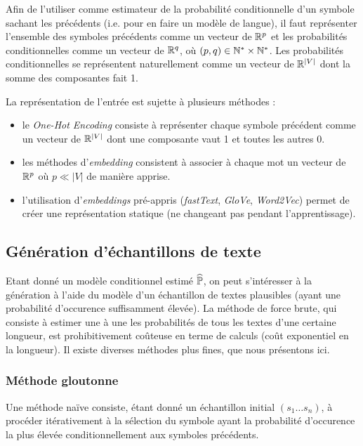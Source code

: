 Afin de l'utiliser comme estimateur de la probabilité conditionnelle d'un symbole sachant les précédents (i.e. pour en faire un modèle de langue), il faut représenter l'ensemble des symboles précédents comme un vecteur de $\R^p$ et les probabilités conditionnelles comme un vecteur de $\R^q$, où $(p,q) \in \N^*\times \N^*$.
Les probabilités conditionnelles se représentent naturellement comme un vecteur de $\R^{\vert V \vert}$ dont la somme des composantes fait 1.

La représentation de l'entrée est sujette à plusieurs méthodes :
\begin{itemize}
  \item le \textit{One-Hot Encoding} consiste à représenter chaque symbole précédent comme un vecteur de $\R^{\vert V \vert}$ dont une composante vaut 1 et toutes les autres 0.
  \item les méthodes d'\textit{embedding} consistent à associer à chaque mot un vecteur de $\R^p$ où $p \ll \vert V\vert$ de manière apprise.
  \item l'utilisation d'\textit{embeddings} pré-appris (\textit{fastText}, \textit{GloVe}, \textit{Word2Vec}) permet de créer une représentation statique (ne changeant pas pendant l'apprentissage).
\end{itemize}

\subsection{Génération d'échantillons de texte}


Etant donné un modèle conditionnel estimé $\widehat{\P}$, on peut s'intéresser à la génération à l'aide du modèle d'un échantillon de textes plausibles (ayant une probabilité d'occurence suffisamment élevée).
La méthode de force brute, qui consiste à estimer une à une les probabilités de tous les textes d'une certaine longueur, est prohibitivement coûteuse en terme de calculs (coût exponentiel en la longueur).
Il existe diverses méthodes plus fines, que nous présentons ici.

\subsubsection{Méthode gloutonne}
Une méthode naïve consiste, étant donné un échantillon initial $(s_1 \ldots s_n)$, à procéder itérativement à la sélection du symbole ayant la probabilité d'occurence la plus élevée conditionnellement aux symboles précédents. \\

